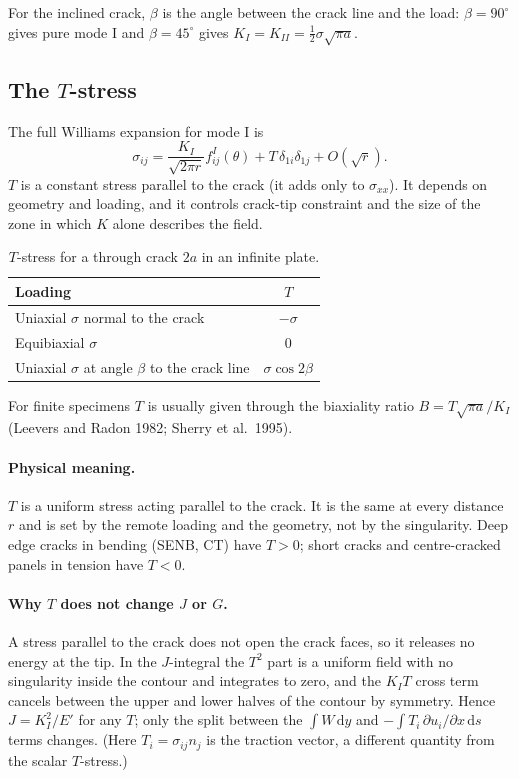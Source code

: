 \documentclass[11pt,a4paper]{article}
\begin{document}
For the inclined crack, $\beta$ is the angle between the crack line and the load:
$\beta=90^\circ$ gives pure mode I and $\beta=45^\circ$ gives $K_I=K_{II}=\tfrac12\sigma\sqrt{\pi a}$.

\subsection{The $T$-stress}
The full Williams expansion for mode I is
\begin{equation}
  \sigma_{ij} = \frac{K_I}{\sqrt{2\pi r}}f^{I}_{ij}(\theta) + T\,\delta_{1i}\delta_{1j} + O(\sqrt r).
\end{equation}
$T$ is a constant stress parallel to the crack (it adds only to $\sigma_{xx}$). It depends on geometry
and loading, and it controls crack-tip constraint and the size of the zone in which $K$ alone describes
the field.

\begin{table}[!htbp]
\centering
\caption{$T$-stress for a through crack $2a$ in an infinite plate.}
\begin{tabular}{@{}lc@{}}
\toprule
Loading & $T$\\
\midrule
Uniaxial $\sigma$ normal to the crack & $-\sigma$\\
Equibiaxial $\sigma$ & $0$\\
Uniaxial $\sigma$ at angle $\beta$ to the crack line & $\sigma\cos2\beta$\\
\bottomrule
\end{tabular}
\end{table}
For finite specimens $T$ is usually given through the biaxiality ratio $B=T\sqrt{\pi a}/K_I$
(Leevers and Radon 1982; Sherry et al.\ 1995).

\paragraph{Physical meaning.} $T$ is a uniform stress acting parallel to the crack. It is the same at every
distance $r$ and is set by the remote loading and the geometry, not by the singularity. Deep edge cracks in
bending (SENB, CT) have $T>0$; short cracks and centre-cracked panels in tension have $T<0$.

\paragraph{Why $T$ does not change $J$ or $G$.} A stress parallel to the crack does not open the crack faces,
so it releases no energy at the tip. In the $J$-integral the $T^2$ part is a uniform field with no singularity
inside the contour and integrates to zero, and the $K_I T$ cross term cancels between the upper and lower
halves of the contour by symmetry. Hence $J=K_I^2/E'$ for any $T$; only the split between the
$\int W\,\mathrm dy$ and $-\int T_i\,\partial u_i/\partial x\,\mathrm ds$ terms changes.
(Here $T_i=\sigma_{ij}n_j$ is the traction vector, a different quantity from the scalar $T$-stress.)
\end{document}
